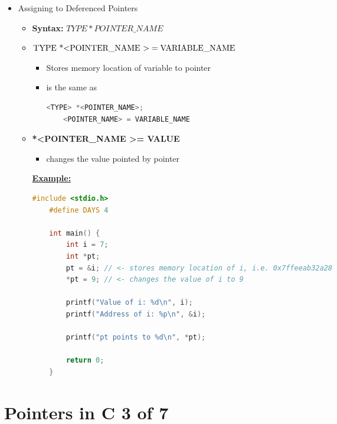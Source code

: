 \documentclass[12pt]{article}
\begin{document}
\begin{itemize}
    \item Assigning to Deferenced Pointers
    \begin{itemize}
    \item \textbf{Syntax:} $TYPE* POINTER\_NAME$
    \item \textbf{$\text{TYPE *\textless POINTER\_NAME \textgreater} = \text{VARIABLE\_NAME}$}
    \begin{itemize}
        \item Stores memory location of variable to pointer
        \item is the same as

    \begin{lstlisting}[language=c]
    <TYPE> *<POINTER_NAME>;
    <POINTER_NAME> = VARIABLE_NAME
    \end{lstlisting}

    \end{itemize}

    \item \textbf{*\textless POINTER\_NAME \textgreater = VALUE}
    \begin{itemize}
        \item changes the value pointed by pointer
    \end{itemize}

    \bigskip

    \underline{\textbf{Example:}}

    \begin{lstlisting}[language=c]
    #include <stdio.h>
    #define DAYS 4

    int main() {
        int i = 7;
        int *pt;
        pt = &i; // <- stores memory location of i, i.e. 0x7ffeeab32a28
        *pt = 9; // <- changes the value of i to 9

        printf("Value of i: %d\n", i);
        printf("Address of i: %p\n", &i);

        printf("pt points to %d\n", *pt);

        return 0;
    }
    \end{lstlisting}

    \end{itemize}
\end{itemize}

\bigskip

\section*{Pointers in C 3 of 7}
\end{document}
